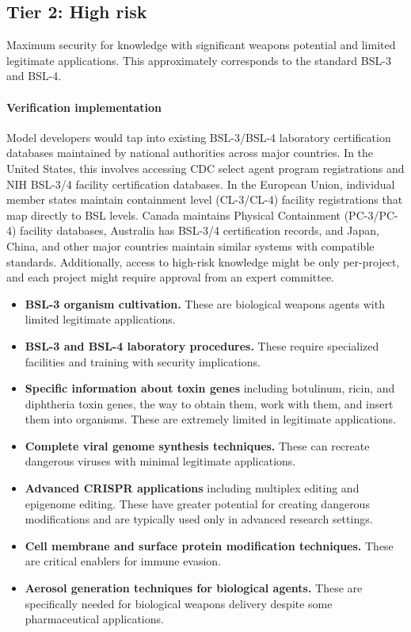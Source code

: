 \documentclass{article}
\theoremstyle{plain}
\theoremstyle{definition}
\theoremstyle{remark}
\begin{document}
\subsection{Tier 2: High risk}

Maximum security for knowledge with significant weapons potential and limited legitimate applications. This approximately corresponds to the standard BSL-3 and BSL-4.

\paragraph{Verification implementation} Model developers would tap into existing BSL-3/BSL-4 laboratory certification databases maintained by national authorities across major countries. In the United States, this involves accessing CDC select agent program registrations and NIH BSL-3/4 facility certification databases. In the European Union, individual member states maintain containment level (CL-3/CL-4) facility registrations that map directly to BSL levels. Canada maintains Physical Containment (PC-3/PC-4) facility databases, Australia has BSL-3/4 certification records, and Japan, China, and other major countries maintain similar systems with compatible standards. Additionally, access to high-risk knowledge might be only per-project, and each project might require approval from an expert committee.

\begin{itemize}
  \item \textbf{BSL-3 organism cultivation.} These are biological weapons agents with limited legitimate applications.
  \item \textbf{BSL-3 and BSL-4 laboratory procedures.} These require specialized facilities and training with security implications.
  \item \textbf{Specific information about toxin genes} including botulinum, ricin, and diphtheria toxin genes, the way to obtain them, work with them, and insert them into organisms. These are extremely limited in legitimate applications.
  \item \textbf{Complete viral genome synthesis techniques.} These can recreate dangerous viruses with minimal legitimate applications.
  \item \textbf{Advanced CRISPR applications} including multiplex editing and epigenome editing. These have greater potential for creating dangerous modifications and are typically used only in advanced research settings.
  \item \textbf{Cell membrane and surface protein modification techniques.} These are critical enablers for immune evasion.
  \item \textbf{Aerosol generation techniques for biological agents.} These are specifically needed for biological weapons delivery despite some pharmaceutical applications.
\end{itemize}
\end{document}
